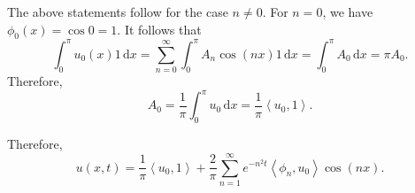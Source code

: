\documentclass[11pt, letterpaper]{report}
\begin{document}
The above statements follow for the case $n\neq 0$. For $n=0$, we have $\phi_0(x)=\cos 0=1$. It follows that
\[
	\int_{0}^{\pi } u_0(x)1 \,\mathrm{d} x=\sum_{n=0}^{\infty} \int_{0}^{\pi } A_n\cos (nx)1 \,\mathrm{d} x=\int_{0}^{\pi } A_0 \,\mathrm{d} x=\pi A_0
.\]
Therefore,
\[
	A_0=\frac{1}{\pi }\int_{0}^{\pi } u_0 \,\mathrm{d} x=\frac{1}{\pi }\left<u_0,1 \right>
.\]

Therefore,
\[
	u(x,t)=\frac{1}{\pi }\left<u_0,1 \right>+\frac{2}{\pi }\sum_{n=1}^{\infty} e^{-n^2t}\left<\phi_n,u_0 \right> \cos(nx)
.\]
\end{document}
